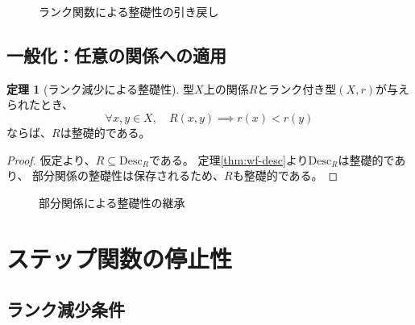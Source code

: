 \documentclass[11pt,a4paper]{ltjsarticle}
\theoremstyle{definition}
\newtheorem{theorem}[definition]{定理}
\begin{document}
\begin{figure}[htbp]
\centering
{}
\caption{ランク関数による整礎性の引き戻し}
\label{fig:pullback}
\end{figure}

\subsection{一般化：任意の関係への適用}

\begin{theorem}[ランク減少による整礎性]
\label{thm:wf-rank-decreasing}
型$X$上の関係$R$とランク付き型$(X, r)$が与えられたとき、
\[
\forall x, y \in X,\quad R(x, y) \implies r(x) < r(y)
\]
ならば、$R$は整礎的である。
\end{theorem}

\begin{proof}
仮定より、$R \subseteq \mathrm{Desc}_R$である。
定理\ref{thm:wf-desc}より$\mathrm{Desc}_R$は整礎的であり、
部分関係の整礎性は保存されるため、$R$も整礎的である。
\end{proof}

\begin{figure}[htbp]
\centering
{}
\caption{部分関係による整礎性の継承}
\end{figure}

\section{ステップ関数の停止性}

\subsection{ランク減少条件}
\end{document}
